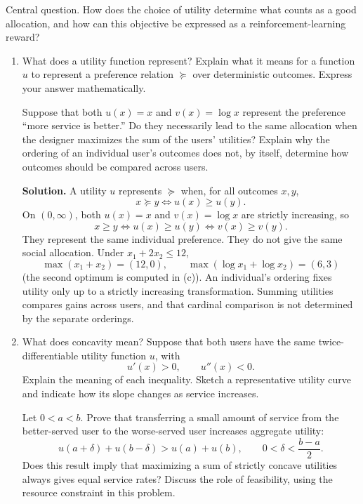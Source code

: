 \documentclass[11pt]{article}
\begin{document}
\begin{enumerate}[label=\arabic*., leftmargin=1.6em]
Central question. How does the choice of utility determine what counts as a good
allocation, and how can this objective be expressed as a reinforcement-learning reward?
\begin{enumerate}
\item What does a utility function represent? Explain what it means for a function $u$
to represent a preference relation $\succeq$ over deterministic outcomes. Express your
answer mathematically.

Suppose that both $u(x)=x$ and $v(x)=\log x$ represent the preference ``more
service is better.'' Do they necessarily lead to the same allocation when the
designer maximizes the sum of the users' utilities? Explain why the ordering of
an individual user's outcomes does not, by itself, determine how outcomes should
be compared across users.

\textbf{Solution.}
A utility \(u\) represents \(\succeq\) when, for all outcomes \(x,y\),
\[
x\succeq y \iff u(x)\ge u(y).
\]
On \((0,\infty)\), both \(u(x)=x\) and \(v(x)=\log x\) are strictly increasing, so
\[
x\ge y \iff u(x)\ge u(y) \iff v(x)\ge v(y).
\]
They represent the same individual preference. They do not give the same social allocation. Under \(x_{1}+2x_{2}\le 12\),
\[
\max(x_{1}+x_{2})=(12,0),
\qquad
\max(\log x_{1}+\log x_{2})=(6,3)
\]
(the second optimum is computed in (c)). An individual's ordering fixes utility only up to a strictly increasing transformation. Summing utilities compares gains across users, and that cardinal comparison is not determined by the separate orderings.

\item What does concavity mean? Suppose that both users have the same twice-differentiable utility function $u$, with
\[
u'(x)>0, \qquad u''(x)<0.
\]
Explain the meaning of each inequality. Sketch a representative utility curve and
indicate how its slope changes as service increases.

Let $0<a<b$. Prove that transferring a small amount of service from the
better-served user to the worse-served user increases aggregate utility:
\[
u(a+\delta)+u(b-\delta) > u(a)+u(b), \qquad 0<\delta<\frac{b-a}{2}.
\]
Does this result imply that maximizing a sum of strictly concave utilities always
gives equal service rates? Discuss the role of feasibility, using the resource constraint in this problem.


\end{enumerate}
\end{enumerate}
\end{document}
